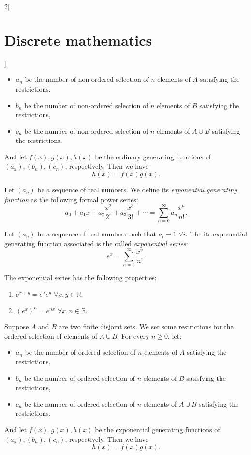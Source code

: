 \documentclass[class=article,10pt,crop=false]{standalone}
\begin{document}
\begin{multicols}{2}[\section{Discrete mathematics}]
\begin{prop}
\begin{itemize}
    \item $a_n$ be the number of non-ordered selection of $n$ elements of $A$ satisfying the restrictions,
    \item $b_n$ be the number of non-ordered selection of $n$ elements of $B$ satisfying the restrictions,
    \item $c_n$ be the number of non-ordered selection of $n$ elements of $A\cup B$ satisfying the restrictions.
\end{itemize}
And let $f(x),g(x),h(x)$ be the ordinary generating functions of $(a_n),(b_n),(c_n)$, respectively. Then we have $$h(x)=f(x)g(x).$$
\end{prop}
\begin{definition}
Let $(a_n)$ be a sequence of real numbers. We define its \textit{exponential generating function} as the following formal power series: $$a_0+a_1x+a_2\frac{x^2}{2!}+a_3\frac{x^3}{3!}+\cdots=\sum_{n=0}^\infty a_n\frac{x^n}{n!}.$$
\end{definition}
\begin{definition}
Let $(a_n)$ be a sequence of real numbers such that $a_i=1$ $\forall i$. The its exponential generating function associated is the called \textit{exponential series}: $$e^x=\sum_{n=0}^\infty \frac{x^n}{n!}.$$
\end{definition}
\begin{prop}
The exponential series has the following properties:
\begin{enumerate}
    \item $e^{x+y}=e^xe^y$ $\forall x,y\in\mathbb{R}$.
    \item $(e^x)^n=e^{nx}$ $\forall x,n\in\mathbb{R}$.
\end{enumerate}
\end{prop}
\begin{prop}
Suppose $A$ and $B$ are two finite disjoint sets. We set some restrictions for the ordered selection of elements of $A\cup B$. For every $n\geq 0$, let:
\begin{itemize}
    \item $a_n$ be the number of ordered selection of $n$ elements of $A$ satisfying the restrictions,
    \item $b_n$ be the number of ordered selection of $n$ elements of $B$ satisfying the restrictions,
    \item $c_n$ be the number of ordered selection of $n$ elements of $A\cup B$ satisfying the restrictions.
\end{itemize}
And let $f(x),g(x),h(x)$ be the exponential generating functions of $(a_n),(b_n),(c_n)$, respectively. Then we have $$h(x)=f(x)g(x).$$

\end{prop}
\end{multicols}
\end{document}
